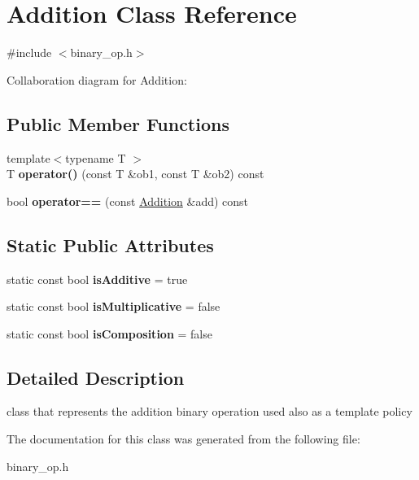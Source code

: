 \hypertarget{classAddition}{\section{Addition Class Reference}
\label{classAddition}
}


{\ttfamily \#include $<$binary\-\_\-op.\-h$>$}



Collaboration diagram for Addition\-:
\subsection*{Public Member Functions}
\begin{DoxyCompactItemize}
\item 
\hypertarget{classAddition_a0cd0e60cd506c9e640d89422303d77b7}{{\footnotesize template$<$typename T $>$ }\\T {\bfseries operator()} (const T \&ob1, const T \&ob2) const }\label{classAddition_a0cd0e60cd506c9e640d89422303d77b7}

\item 
\hypertarget{classAddition_a10141b1b99b171bf711fde50f73624a2}{bool {\bfseries operator==} (const \hyperlink{classAddition}{Addition} \&add) const }\label{classAddition_a10141b1b99b171bf711fde50f73624a2}

\end{DoxyCompactItemize}
\subsection*{Static Public Attributes}
\begin{DoxyCompactItemize}
\item 
\hypertarget{classAddition_a24b52cf787fbb2997cca7fabd26feb9b}{static const bool {\bfseries is\-Additive} = true}\label{classAddition_a24b52cf787fbb2997cca7fabd26feb9b}

\item 
\hypertarget{classAddition_a5e060aac1855b53aa87849ea9e439cd9}{static const bool {\bfseries is\-Multiplicative} = false}\label{classAddition_a5e060aac1855b53aa87849ea9e439cd9}

\item 
\hypertarget{classAddition_a7fce2d48cdd7335298e138775b9fde7b}{static const bool {\bfseries is\-Composition} = false}\label{classAddition_a7fce2d48cdd7335298e138775b9fde7b}

\end{DoxyCompactItemize}


\subsection{Detailed Description}
class that represents the addition binary operation used also as a template policy 

The documentation for this class was generated from the following file\-:\begin{DoxyCompactItemize}
\item 
binary\-\_\-op.\-h\end{DoxyCompactItemize}
